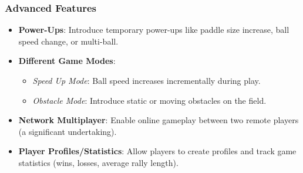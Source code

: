\documentclass[12pt,a4paper]{article}
\begin{document}
\subsubsection{Advanced Features}
\begin{itemize}
    \item \textbf{Power-Ups}: Introduce temporary power-ups like paddle size increase, ball speed change, or multi-ball.
    \item \textbf{Different Game Modes}:
    \begin{itemize}
        \item \textit{Speed Up Mode}: Ball speed increases incrementally during play.
        \item \textit{Obstacle Mode}: Introduce static or moving obstacles on the field.
    \end{itemize}
    \item \textbf{Network Multiplayer}: Enable online gameplay between two remote players (a significant undertaking).
    \item \textbf{Player Profiles/Statistics}: Allow players to create profiles and track game statistics (wins, losses, average rally length).
\end{itemize}
\end{document}
